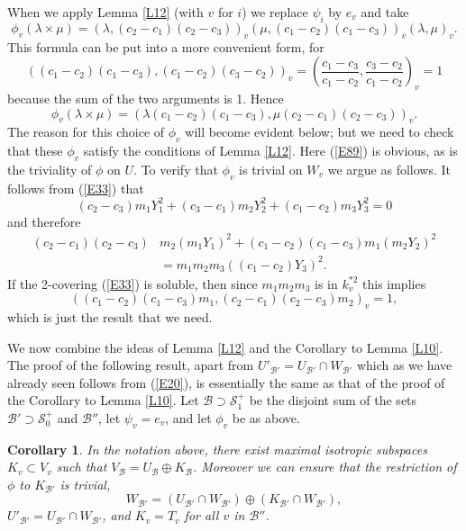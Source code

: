\documentclass[12pt]{article}
\def\gl{{\lambda}}
\def\sB{{\mathcal B}}
\def\sS{{\mathcal S}}
\def\beq{\begin{equation} \label}
\newtheorem{Cor}{Corollary}
\begin{document}
When we apply Lemma \ref{L12} (with $v$ for
$i$) we replace $\psi_i$ by $e_v$ and take
\beq{E83} \phi_v(\gl\times\mu)=(\gl,(c_2-c_1)(c_2-c_3))_v
(\mu,(c_1-c_2)(c_1-c_3))_v(\gl,\mu)_v. \end{equation}
This formula can be put into a more convenient form, for
\[ ((c_1-c_2)(c_1-c_3),(c_1-c_2)(c_3-c_2))_v=
\left(\frac{c_1-c_3}{c_1-c_2},\frac{c_3-c_2}{c_1-c_2}\right)_v=1 \]
because the sum of the two arguments is 1. Hence
\[ \phi_v(\gl\times\mu)=
(\gl(c_1-c_2)(c_1-c_3),\mu(c_2-c_1)(c_2-c_3))_v. \]
The reason for this choice of $\phi_v$ will become evident
below; but we need to check that these $\phi_v$
satisfy the conditions of Lemma \ref{L12}. Here (\ref{E89}) is
obvious, as is the triviality of $\phi$ on $U$. To verify
that $\phi_v$ is trivial on $W_v$ we argue as follows. It
follows from (\ref{E33}) that
\beq{E79} (c_2-c_3)m_1Y_1^2+(c_3-c_1)m_2Y_2^2+
(c_1-c_2)m_3Y_3^2=0 \end{equation}
and therefore
\begin{align*} (c_2-c_1)(c_2-c_3) & m_2(m_1Y_1)^2+(c_1-c_2)(c_1-c_3)m_1(m_2Y_2)^2 \\
 & =m_1m_2m_3((c_1-c_2)Y_3)^2. \end{align*}
If the 2-covering (\ref{E33}) is soluble, then since
$m_1m_2m_3$ is in $k_v^{*2}$ this implies
\beq{E98} ((c_1-c_2)(c_1-c_3)m_1,(c_2-c_1)(c_2-c_3)m_2)_v=1, \end{equation}
which is just the result that we need.

We now combine the ideas of Lemma \ref{L12} and the Corollary
to Lemma \ref{L10}. The proof of the following result, apart
from $U'_{\sB'}=U_{\sB'}\cap W_{\sB'}$ which as we have
already seen follows from (\ref{E20}), is essentially the
same as that of the proof of the Corollary to Lemma \ref{L10}.
Let $\sB\supset\sS^+_1$ be the disjoint sum of the
sets $\sB'\supset\sS^+_0$ and $\sB''$, let $\psi_v=e_v$, and
let $\phi_v$ be as above.
\begin{Cor} In the notation above, there exist maximal
isotropic subspaces $K_v\subset V_v$ such that
$V_\sB=U_\sB\oplus K_\sB$. Moreover we can ensure that
the restriction of $\phi$ to $K_{\sB'}$ is trivial,
\beq{E20} W_{\sB'}=(U_{\sB'}\cap W_{\sB'})\oplus(K_{\sB'}\cap W_{\sB'}),
\end{equation}
$U'_{\sB'}=U_{\sB'}\cap W_{\sB'}$, and $K_v=T_v$ for all $v$
in $\sB''$.
\end{Cor}

\medskip
\end{document}
